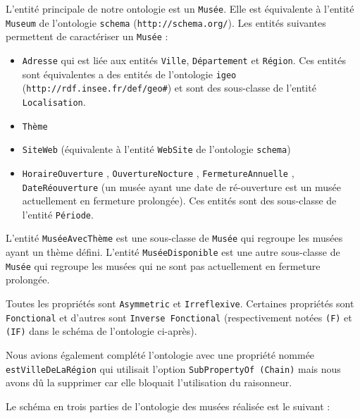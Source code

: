 \documentclass{article}
\begin{document}
L'entité principale de notre ontologie est un \texttt{Musée}. Elle est
équivalente à l'entité \texttt{Museum} de l'ontologie \texttt{schema}
(\texttt{http://schema.org/}). Les entités suivantes permettent de caractériser
un \texttt{Musée} : 
\begin{itemize}
  \item \texttt{Adresse} qui est liée aux entités \texttt{Ville},
\texttt{Département} et \texttt{Région}. Ces entités sont
équivalentes a des entités de l'ontologie \texttt{igeo}
(\texttt{http://rdf.insee.fr/def/geo\#}) et sont des sous-classe de l'entité
\texttt{Localisation}.
  \item \texttt{Thème}
  \item \texttt{SiteWeb} (équivalente à
l'entité \texttt{WebSite} de l'ontologie \texttt{schema})
\item \texttt{HoraireOuverture} , \texttt{OuvertureNocture}
, \texttt{FermetureAnnuelle} , \texttt{DateRéouverture} (un musée ayant une date
de ré-ouverture est un musée actuellement en fermeture prolongée). Ces entités
sont des sous-classe de l'entité \texttt{Période}.
\end{itemize}

\vspace{0.3cm}

L'entité \texttt{MuséeAvecThème} est une sous-classe de \texttt{Musée} qui
regroupe les musées ayant un thème défini. L'entité \texttt{MuséeDisponible} est
une autre sous-classe de \texttt{Musée} qui regroupe les musées qui ne sont
pas actuellement en fermeture prolongée.

\vspace{0.3cm}

Toutes les propriétés sont \texttt{Asymmetric} et \texttt{Irreflexive}.
Certaines propriétés sont \texttt{Fonctional} et d'autres sont
\texttt{Inverse Fonctional} (respectivement notées \texttt{(F)} et \texttt{(IF)}
dans le schéma de l'ontologie ci-après).

Nous avions également complété l'ontologie avec une
propriété nommée \texttt{estVilleDeLaRégion} qui utilisait l'option
\texttt{SubPropertyOf (Chain)} mais nous avons dû la supprimer car elle
bloquait l'utilisation du raisonneur.

\newpage

Le schéma en trois parties de l'ontologie des musées réalisée est le suivant :
\end{document}
